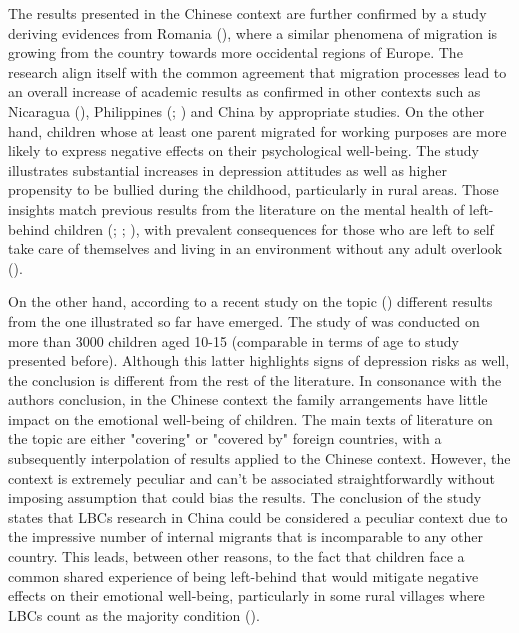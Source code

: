 The results presented in the Chinese context are further confirmed by a study deriving evidences from Romania (\cite{botezat2014impact}), where a similar phenomena of migration is growing from the country towards more occidental regions of Europe. The research align itself with the common agreement that migration processes lead to an overall increase of academic results as confirmed in other contexts such as Nicaragua (\cite{macours2010seasonal}), Philippines (\cite{arguillas2010impact}; \cite{yang2008international}) and China by appropriate studies. On the other hand, children whose at least one parent migrated for working purposes are more likely to express negative effects on their psychological well-being. The study illustrates substantial increases in depression attitudes as well as higher propensity to be bullied during the childhood, particularly in rural areas. Those insights match previous results from the literature on the mental health of left-behind children (\cite{gibson2011happens}; \cite{dreby2007children}; \cite{mazzucato2011transnational}), with prevalent consequences for those who are left to self take care of themselves and living in an environment without any adult overlook (\cite{lahaie2009work}).

On the other hand, according to a recent study on the topic (\cite{ren2016consequences}) different results from the one illustrated so far have emerged. The study of \textcite{ren2016consequences} was conducted on more than 3000 children aged 10-15 (comparable in terms of age to \textcite{he2012depression} study presented before). Although this latter highlights signs of depression risks as well, the conclusion is different from the rest of the literature. In consonance with the authors conclusion, in the Chinese context the family arrangements have little impact on the emotional well-being of children. The main texts of literature on the topic are either "covering" or "covered by" foreign countries, with a subsequently interpolation of results applied to the Chinese context. However, the context is extremely peculiar and can't be associated straightforwardly without imposing assumption that could bias the results. The conclusion of the study states that LBCs research in China could be considered a peculiar context due to the impressive number of internal migrants that is incomparable to any other country. This leads, between other reasons, to the fact that children face a common shared experience of being left-behind that would mitigate negative effects on their emotional well-being, particularly in some rural villages where LBCs count as the majority condition (\cite{hao2006discussion}).